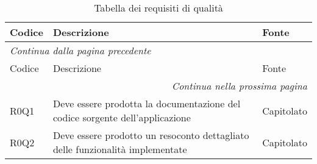 \begin{longtable}{lp{}l}
\caption{Tabella dei requisiti di qualità}
\label{tab:requsiti qualità} \\
\toprule
Codice & Descrizione & Fonte \\
\midrule
\endfirsthead
\multicolumn{3}{l}{\footnotesize\itshape Continua dalla pagina precedente}\\
\toprule
Codice & Descrizione & Fonte \\
\midrule
\endhead
\midrule
\multicolumn{3}{r}{\footnotesize\itshape Continua nella prossima pagina}\\
\endfoot
\bottomrule
\endlastfoot
R0Q1 & Deve essere prodotta la documentazione del codice sorgente dell'applicazione 	& Capitolato \\[7mm]
R0Q2 & Deve essere prodotto un resoconto dettagliato delle funzionalità implementate	& Capitolato \\
\end{longtable}